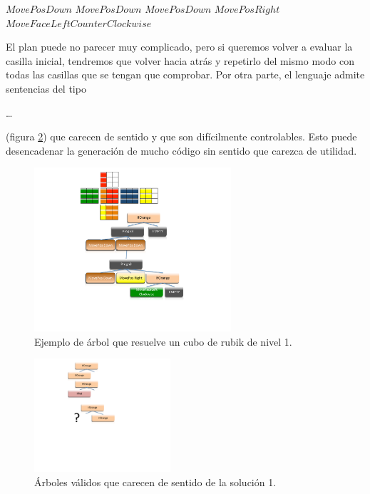 \begin{algorithmic}
        \STATE $MovePosDown$
        \STATE $MovePosDown$
        \STATE $MovePosDown$
        \STATE $MovePosRight$
                \STATE $MoveFaceLeftCounterClockwise$
        \ENDIF
\ENDIF 
\end{algorithmic}

El plan puede no parecer muy complicado, pero si queremos volver a evaluar la
casilla inicial, tendremos que volver hacia atrás y repetirlo del mismo modo con
todas las casillas que se tengan que comprobar. Por otra parte, el lenguaje
admite sentencias del tipo 
\begin{algorithmic}
                \STATE \ldots
        \ENDIF
\ENDIF 
\end{algorithmic} 
(figura \ref{fig:leng1ejemplo2}) que carecen de sentido y que son
difícilmente controlables. Esto puede desencadenar la generación de mucho código
sin sentido que carezca de utilidad.




\begin{figure}[t]
\centering
\includegraphics[width=0.65\textwidth]{figs/pdf/leng1ejem1}
\caption{Ejemplo de árbol que resuelve un cubo de rubik de nivel 1.}
\label{fig:leng1ejemplo1}
\end{figure}

\begin{figure}[t]
\centering
\includegraphics[width=0.45\textwidth]{figs/pdf/leng1ejem2}
\caption{Árboles válidos que carecen de sentido de la solución 1.}
\label{fig:leng1ejemplo2}
\end{figure}


